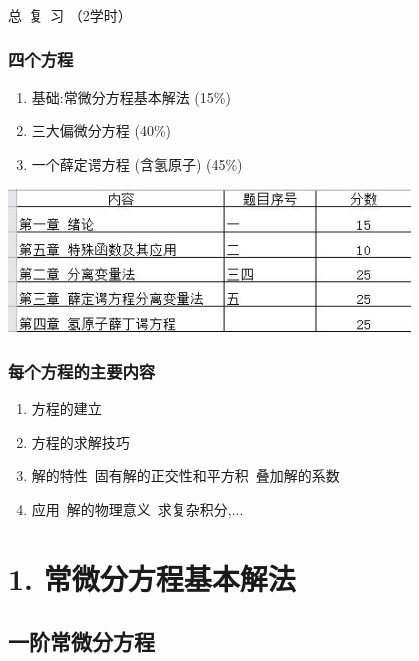 \begin{frame}
	\frametitle{}
	\Background[1] 
	\begin{center}
	{ {\Huge 总~复~习 （2学时）}}
	\end{center}    
\end{frame}

\begin{frame} 
      \frametitle{四个方程}
      \begin{enumerate}
          \item 基础:常微分方程基本解法 (15\%)
          \item 三大偏微分方程 (40\%)
          \item 一个薛定谔方程 (含氢原子) (45\%)
      \end{enumerate}
      \begin{center}
           \includegraphics[width=0.8\textwidth]{figs/2022-05-10-13-48-04.png}
      \end{center}
\end{frame}

\begin{frame} [label=current] 
 \frametitle{每个方程的主要内容}
 \begin{enumerate}
     \item 方程的建立
     \item 方程的求解技巧
     \item 解的特性~固有解的正交性和平方积~叠加解的系数
     \item 应用~解的物理意义~求复杂积分,...
 \end{enumerate}
      
\end{frame}


\section{1. 常微分方程基本解法}

\subsection{一阶常微分方程}

